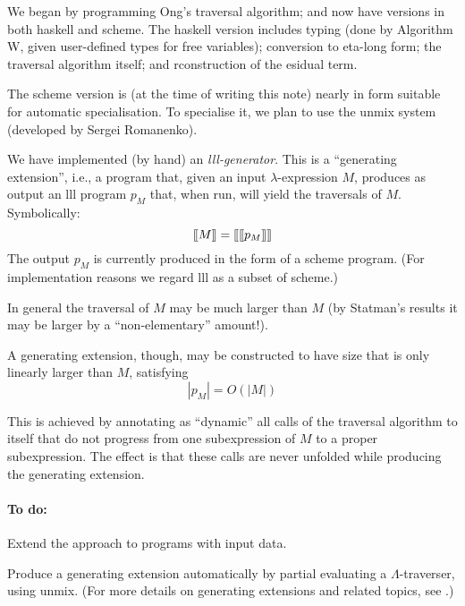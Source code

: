 \documentclass{llncs}
\begin{document}
{\be
\item We began by programming Ong's  traversal algorithm; and now have versions in both {\sc haskell} and {\sc scheme}. The {\sc haskell} version includes typing (done by Algorithm W, given user-defined types for free variables); conversion to eta-long form;  the traversal algorithm itself; and rconstruction of the esidual term.

\item The {\sc scheme} version is (at the time of writing this note) nearly in form suitable for automatic specialisation. To specialise it, we plan to use the {\sc unmix} system (developed by Sergei Romanenko).

\item We have implemented (by hand) an {\em {\sc lll}-generator}. This is a ``generating extension'', i.e., a program that, given an input $\lambda$-expression $M$, produces as output an {\sc lll}  program $p_M$  that, when run, will yield the traversals of $M$. Symbolically:
$$\mbox{$\lbrack\hspace{-0.3ex}\lbrack$} M\mbox{$\rbrack\hspace{-0.3ex}\rbrack$} = \mbox{$\lbrack\hspace{-0.3ex}\lbrack$} \mbox{$\lbrack\hspace{-0.3ex}\lbrack$} p_M\mbox{$\rbrack\hspace{-0.3ex}\rbrack$} \mbox{$\rbrack\hspace{-0.3ex}\rbrack$}
$$
The output $p_M$ is currently produced in the form of a {\sc scheme}  program. (For implementation  reasons we regard {\sc lll} as a subset of {\sc scheme}.)


\item In general the traversal of $M$ may be much larger than $M$ (by Statman's results it may be larger by a ``non-elementary'' amount!). 

A generating extension, though,  may be constructed to have size that is only linearly larger than $M$, satisfying 
$$|p_M| = O(|M|)$$

This is achieved by annotating as ``dynamic'' all calls of the traversal algorithm to itself that do not progress from one subexpression of $M$ to a proper subexpression. The effect is that these calls are never unfolded while producing the generating extension.

\ee


\paragraph{To do:} 

\be

\item Extend the approach to programs with input data.


\item Produce a generating extension automatically by partial evaluating a $\Lambda$-traverser,  using {\sc unmix}. 
(For more details on generating extensions and related topics, see \cite{jgs93}.)

}
\end{document}
